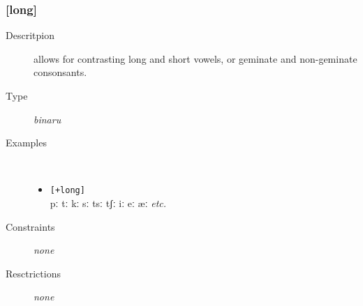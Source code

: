 \documentclass[10pt,letterpaper]{article}
\begin{document}
\subsubsection{[long]}
\label{ssub:feature_long}

\begin{description}
\item[Descritpion] allows for contrasting long and short vowels, or geminate and non-geminate consonsants.
\item[Type] \emph{binaru}
\item[Examples]\
  \begin{itemize}
    \item \texttt{[+long]}\\
    pː tː kː sː tsː tʃː iː eː æː \emph{etc.}
  \end{itemize}
\item[Constraints] \emph{none}
\item[Resctrictions] \emph{none}
\end{description}
\end{document}
